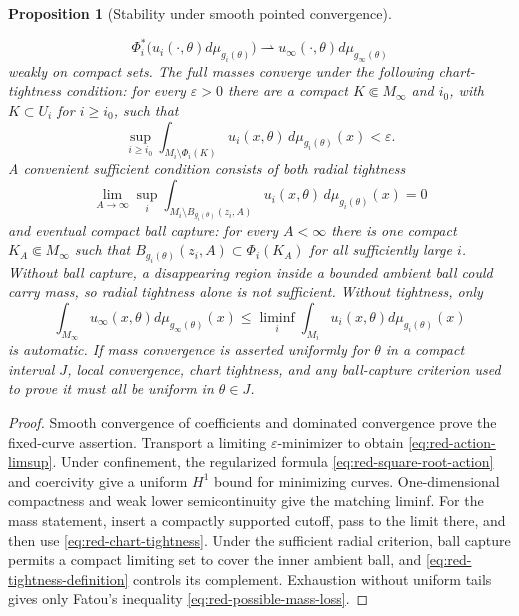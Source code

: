 \documentclass[10pt]{coll-l}
\newtheorem{proposition}[theorem]{Proposition}
\theoremstyle{definition}
\theoremstyle{remark}
\numberwithin{section}{chapter}
\numberwithin{equation}{chapter}
\begin{document}
\begin{proposition}[Stability under smooth pointed convergence]
\begin{enumerate}
\begin{equation}
 \Phi_i^*\bigl(u_i(\cdot,\theta)d\mu_{g_i(\theta)}\bigr)
 \rightharpoonup
 u_\infty(\cdot,\theta)d\mu_{g_\infty(\theta)}          \label{eq:red-local-measure-convergence}
\end{equation}
      weakly on compact sets.  The full masses
      converge under the following chart-tightness condition: for every
      $\varepsilon>0$ there are a compact $K\Subset M_\infty$ and $i_0$,
      with $K\subset U_i$ for $i\geq i_0$, such that
\begin{equation}
 \sup_{i\geq i_0}\int_{M_i\setminus\Phi_i(K)}
             u_i(x,\theta)\,d\mu_{g_i(\theta)}(x)
       <\varepsilon.                                    \label{eq:red-chart-tightness}
\end{equation}
A convenient sufficient condition consists of both radial tightness
\begin{equation}
 \lim_{A\to\infty}\sup_i
 \int_{M_i\setminus B_{g_i(\theta)}(z_i,A)}
             u_i(x,\theta)\,d\mu_{g_i(\theta)}(x)=0     \label{eq:red-tightness-definition}
\end{equation}
and eventual compact ball capture: for every $A<\infty$ there is one compact
$K_A\Subset M_\infty$ such that
$B_{g_i(\theta)}(z_i,A)\subset\Phi_i(K_A)$ for all sufficiently large $i$.
Without ball capture, a disappearing region inside a bounded ambient ball
could carry mass, so radial tightness alone is not sufficient.
Without tightness, only
\begin{equation}
 \int_{M_\infty}u_\infty(x,\theta)d\mu_{g_\infty(\theta)}(x)
       \leq\liminf_i\int_{M_i}u_i(x,\theta)d\mu_{g_i(\theta)}(x)
                                                               \label{eq:red-possible-mass-loss}
\end{equation}
is automatic.
If mass convergence is asserted uniformly for $\theta$ in a compact
interval $J$, local convergence, chart tightness, and any ball-capture
criterion used to prove it must all be uniform in $\theta\in J$.
\end{enumerate}
\end{proposition}

\begin{proof}
Smooth convergence of coefficients and dominated convergence prove the
fixed-curve assertion.  Transport a limiting $\varepsilon$-minimizer to
obtain \eqref{eq:red-action-limsup}.  Under confinement, the regularized
formula \eqref{eq:red-square-root-action} and coercivity give a uniform
$H^1$ bound for minimizing curves.  One-dimensional compactness and weak
lower semicontinuity give the matching liminf.  For the mass statement,
insert a compactly supported cutoff, pass to the limit there, and then use
\eqref{eq:red-chart-tightness}.  Under the sufficient radial criterion,
ball capture permits a compact limiting set to cover the inner ambient ball,
and \eqref{eq:red-tightness-definition} controls its complement.  Exhaustion
without uniform tails gives
only Fatou's inequality \eqref{eq:red-possible-mass-loss}.
\end{proof}
\end{document}
